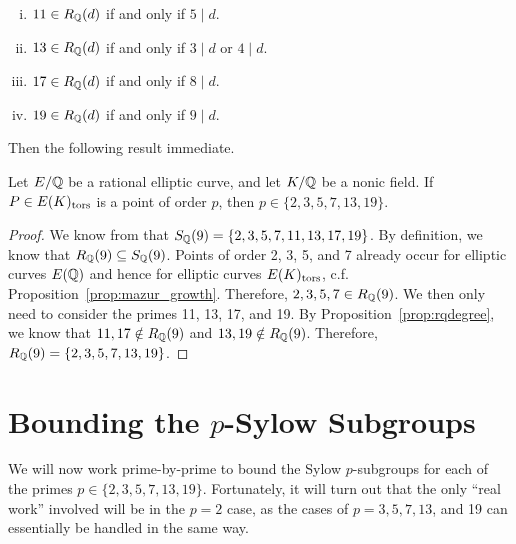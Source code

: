 \begin{prop} \label{prop:rqdegree} \hfill
	\begin{enumerate}[(i)]
	\item $11 \in R_{\mathbb{Q}}(d)$ if and only if $5 \mid d$.
	\item $13 \in R_{\mathbb{Q}}(d)$ if and only if $3 \mid d$ or $4 \mid d$. 
	\item $17 \in R_{\mathbb{Q}}(d)$ if and only if $8 \mid d$.
	\item $19 \in R_{\mathbb{Q}}(d)$ if and only if $9 \mid d$. 
	\end{enumerate}
\end{prop}


Then the following result immediate.


\begin{lem} \label{lem:nonicprimeorder}
Let $E/\mathbb{Q}$ be a rational elliptic curve, and let $K/\mathbb{Q}$ be a nonic field. If $P \in E(K)_{\text{tors}}$ is a point of order $p$, then $p \in \{ 2, 3, 5, 7, 13, 19 \}$. 
\end{lem}

\begin{proof} 
We know from \cite[Corollary~1.5]{lozanorobledo13} that $S_{\mathbb{Q}}(9)= \{ 2, 3, 5, 7, 11, 13, 17, 19 \}$. By definition, we know that $R_{\mathbb{Q}}(9) \subseteq S_{\mathbb{Q}}(9)$. Points of order 2, 3, 5, and 7 already occur for elliptic curves $E(\mathbb{Q})$ and hence for elliptic curves $E(K)_{\text{tors}}$, c.f. Proposition~\ref{prop:mazur_growth}. Therefore, $2, 3, 5, 7 \in R_{\mathbb{Q}}(9)$. We then only need to consider the primes 11, 13, 17, and 19. By Proposition~\ref{prop:rqdegree}, we know that $11, 17 \notin R_{\mathbb{Q}}(9)$ and $13, 19 \notin R_{\mathbb{Q}}(9)$. Therefore, $R_{\mathbb{Q}}(9)= \{ 2, 3, 5, 7, 13, 19 \}$. 
\end{proof}





\section{Bounding the $p$-Sylow Subgroups\label{sec:nonicsylowbound}}

We will now work prime-by-prime to bound the Sylow $p$-subgroups for each of the primes $p \in \{ 2, 3, 5, 7, 13, 19 \}$. Fortunately, it will turn out that the only ``real work'' involved will be in the $p= 2$ case, as the cases of $p= 3, 5, 7, 13$, and 19 can essentially be handled in the same way.



